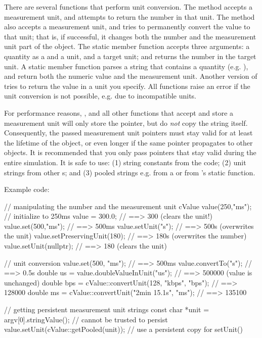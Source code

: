 There are several functions that perform unit conversion. The
 method accepts a measurement unit, and attempts
to return the number in that unit. The  method also
accepts a measurement unit, and tries to permanently convert the value to
that unit; that is, if successful, it changes both the number and the
measurement unit part of the object. The  static
 member function accepts three arguments: a quantity as a
 and a unit, and a target unit; and returns the number in the
target unit. A  static member function parses
a string that contains a quantity (e.g. ), and return
both the numeric value and the measurement unit. Another version of
 tries to return the value in a unit you specify.
All functions raise an error if the unit conversion is not possible, e.g.
due to incompatible units.

For performance reasons, ,  and all other
functions that accept and store a measurement unit will only store the
 pointer, but do \textit{not} copy the string itself.
Consequently, the passed measurement unit pointers must stay valid for at
least the lifetime of the  object, or even longer if the
same pointer propagates to other  objects. It is
recommended that you only pass pointers that stay valid during the entire
simulation. It is safe to use: (1) string constants from the code; (2) unit
strings from other s; and (3) pooled strings e.g. from a
 or from 's static 
function.

Example code:

\begin{cpp}
// manipulating the number and the measurement unit
cValue value(250,"ms");    // initialize to 250ms
value = 300.0;                // ==> 300 (clears the unit!)
value.set(500,"ms");          // ==> 500ms
value.setUnit("s");           // ==> 500s (overwrites the unit)
value.setPreservingUnit(180); // ==> 180s (overwrites the number)
value.setUnit(nullptr);       // ==> 180 (clears the unit)

// unit conversion
value.set(500, "ms");         // ==> 500ms
value.convertTo("s");         // ==> 0.5s
double us = value.doubleValueInUnit("us"); // ==> 500000 (value is unchanged)
double bps = cValue::convertUnit(128, "kbps", "bps"); // ==> 128000
double ms = cValue::convertUnit("2min 15.1s", "ms"); // ==> 135100

// getting persistent measurement unit strings
const char *unit = argv[0].stringValue(); // cannot be trusted to persist
value.setUnit(cValue::getPooled(unit)); // use a persistent copy for setUnit()
\end{cpp}


